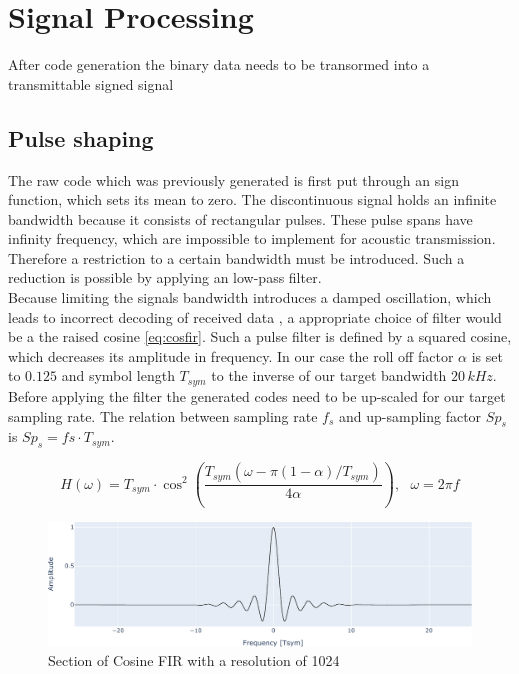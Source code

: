 
\chapter{Signal Processing}
After code generation the binary data needs to be transormed into a transmittable signed signal


\section{Pulse shaping}

The raw code which was previously generated is first put through an sign function, which sets its mean to zero. The discontinuous signal holds an infinite bandwidth because it consists of rectangular pulses. These pulse spans have infinity frequency, which are impossible to implement for acoustic transmission. Therefore a restriction to a certain bandwidth must be introduced. Such a reduction is possible by applying an low-pass filter.\\
Because limiting the signals bandwidth introduces a damped oscillation, which leads to incorrect decoding of received data \cite{ken07}, a appropriate choice of filter would be a the raised cosine \ref{eq:cosfir}. Such a pulse filter is defined by a squared cosine, which decreases its amplitude in frequency. In our case the roll off factor $\alpha$ is set to $0.125$ and symbol length $T_{sym}$ to the inverse of our target bandwidth $20\,kHz$.\\
Before applying the filter the generated codes need to be up-scaled for our target sampling rate. The relation between sampling rate $f_s$ and up-sampling factor $Sp_s$ is $Sp_s=fs\cdot T_{sym}$.

\begin{equation}
	H(\omega)=T_{sym}\cdot \cos^2\left(\dfrac{T_{sym}(\omega-\pi(1-\alpha)/T_{sym})}{4\alpha}\right),~~~\omega=2\pi f
	\label{eq:cosfir}
\end{equation}


\begin{figure}[h]
	\includegraphics[width=\linewidth]{images/cosfir}
	\caption{Section of Cosine FIR with a resolution of 1024}
	\label{fig:cosfir}
\end{figure}



